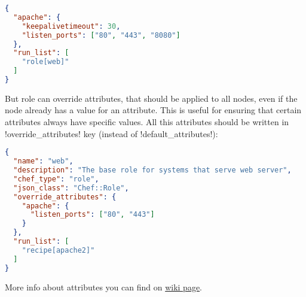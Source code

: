 \begin{lstlisting}[language=JSON,label=lst:my-cloud-attributes3]
{
  "apache": {
    "keepalivetimeout": 30,
    "listen_ports": ["80", "443", "8080"]
  },
  "run_list": [
    "role[web]"
  ]
}
\end{lstlisting}

But role can override attributes, that should be applied to all nodes, even if the node already has a value for an attribute. This is useful for ensuring that certain attributes always have specific values. All this attributes should be written in \inline!override_attributes! key (instead of \inline!default_attributes!):

\begin{lstlisting}[language=JSON,label=lst:my-cloud-attributes2]
{
  "name": "web",
  "description": "The base role for systems that serve web server",
  "chef_type": "role",
  "json_class": "Chef::Role",
  "override_attributes": {
    "apache": {
      "listen_ports": ["80", "443"]
    }
  },
  "run_list": [
    "recipe[apache2]"
  ]
}
\end{lstlisting}

More info about attributes you can find on \href{http://docs.opscode.com/chef_overview_attributes.html}{wiki page}.